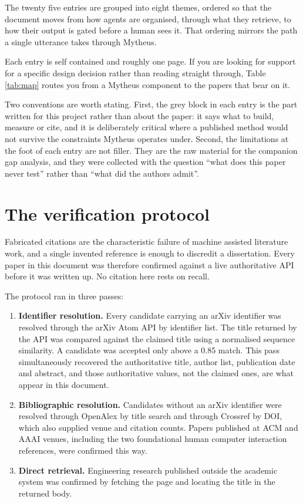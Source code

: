 The twenty five entries are grouped into eight themes, ordered so that the
document moves from how agents are organised, through what they retrieve, to
how their output is gated before a human sees it. That ordering mirrors the
path a single utterance takes through Mytheus.

Each entry is self contained and roughly one page. If you are looking for
support for a specific design decision rather than reading straight through,
Table \ref{tab:map} routes you from a Mytheus component to the papers that
bear on it.

Two conventions are worth stating. First, the grey block in each entry is the
part written for this project rather than about the paper: it says what to
build, measure or cite, and it is deliberately critical where a published
method would not survive the constraints Mytheus operates under. Second, the
limitations at the foot of each entry are not filler. They are the raw
material for the companion gap analysis, and they were collected with the
question ``what does this paper never test'' rather than ``what did the
authors admit''.

\section*{The verification protocol}


Fabricated citations are the characteristic failure of machine assisted
literature work, and a single invented reference is enough to discredit a
dissertation. Every paper in this document was therefore confirmed against a
live authoritative API before it was written up. No citation here rests on
recall.

The protocol ran in three passes:

\begin{enumerate}
\item \textbf{Identifier resolution.} Every candidate carrying an arXiv
identifier was resolved through the arXiv Atom API by identifier list. The
title returned by the API was compared against the claimed title using a
normalised sequence similarity. A candidate was accepted only above a 0.85
match. This pass simultaneously recovered the authoritative title, author
list, publication date and abstract, and those authoritative values, not the
claimed ones, are what appear in this document.

\item \textbf{Bibliographic resolution.} Candidates without an arXiv identifier
were resolved through OpenAlex by title search and through Crossref by DOI,
which also supplied venue and citation counts. Papers published at ACM and
AAAI venues, including the two foundational human computer interaction
references, were confirmed this way.

\item \textbf{Direct retrieval.} Engineering research published outside the
academic system was confirmed by fetching the page and locating the title in
the returned body.
\end{enumerate}

